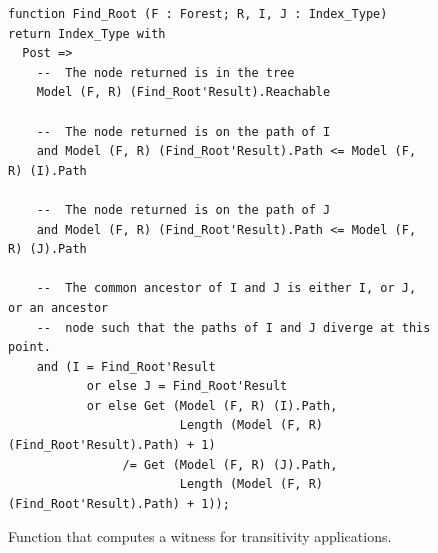 \documentclass{llncs}
\begin{document}
\begin{figure}
\begin{small}
\begin{lstlisting}
function Find_Root (F : Forest; R, I, J : Index_Type) return Index_Type with
  Post =>
    --  The node returned is in the tree
    Model (F, R) (Find_Root'Result).Reachable

    --  The node returned is on the path of I
    and Model (F, R) (Find_Root'Result).Path <= Model (F, R) (I).Path

    --  The node returned is on the path of J
    and Model (F, R) (Find_Root'Result).Path <= Model (F, R) (J).Path

    --  The common ancestor of I and J is either I, or J, or an ancestor
    --  node such that the paths of I and J diverge at this point.
    and (I = Find_Root'Result
           or else J = Find_Root'Result
           or else Get (Model (F, R) (I).Path,
                        Length (Model (F, R) (Find_Root'Result).Path) + 1)
                /= Get (Model (F, R) (J).Path,
                        Length (Model (F, R) (Find_Root'Result).Path) + 1));
\end{lstlisting}
\end{small}
\caption{\label{fig-proof-wit} Function that computes a witness for transitivity applications.}
\end{figure}
\end{document}
